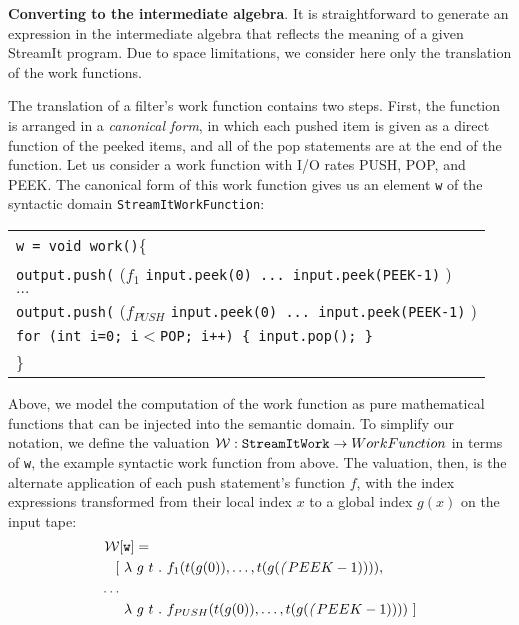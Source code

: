 {\bf Converting to the intermediate algebra}.  It is straightforward
to generate an expression in the intermediate algebra that reflects
the meaning of a given StreamIt program.  Due to space limitations, we
consider here only the translation of the work functions.

The translation of a filter's work function contains two steps.
First, the function is arranged in a {\it canonical form}, in which
each pushed item is given as a direct function of the peeked items,
and all of the pop statements are at the end of the function.  Let us
consider a work function with I/O rates PUSH, POP, and PEEK.  The
canonical form of this work function gives us an element {\tt w} of
the syntactic domain {\tt StreamItWorkFunction}: \\
\vspace{0.2in}
\begin{scriptsize}
\begin{tabular}{l}
{\tt w = void work()}\{ \\
\hspace{12pt} {\tt output.push(} ($f_{1}$ {\tt input.peek(0) ... input.peek(PEEK-1)} ) \\
\hspace{12pt} $\dots$ \\
\hspace{12pt} {\tt output.push(} ($f_{PUSH}$ {\tt input.peek(0) ... input.peek(PEEK-1)} ) \\
\hspace{12pt} {\tt for (int i=0; i$<$POP; i++) \{ input.pop(); \}} \\
\}
\vspace{-12pt}
\end{tabular}
\end{scriptsize}
Above, we model the computation of the work function as pure
mathematical functions that can be injected into the semantic domain.
To simplify our notation, we define the valuation ${\cal W}: {\tt
StreamIt Work} \ra WorkFunction$ in terms of {\tt w}, the example
syntactic work function from above.  The valuation, then, is the
alternate application of each push statement's function $f$, with the
index expressions transformed from their local index $x$ to a global
index $g(x)$ on the input tape:
\begin{align*}
{\cal W}&[{\tt w}] = \\
[&~\la~g~t~.~f_1(t(g(0)), \dots, t(g(\fn(PEEK-1)))), \\
\dots \\
&~\la~g~t~.~f_{PUSH}(t(g(0)), \dots, t(g(\fn(PEEK-1))))~]
\end{align*}

